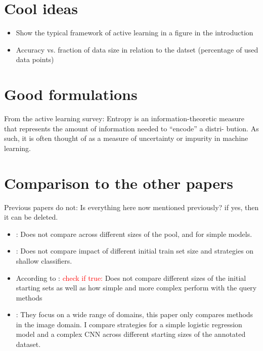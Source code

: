 \documentclass{article}
\theoremstyle{plain}
\theoremstyle{definition}
\theoremstyle{remark}
\begin{document}
\newpage

\section{Cool ideas}
\begin{itemize}
	\item Show the typical framework of active learning in a figure in the introduction
	\item Accuracy vs. fraction of data size in relation to the datset (percentage of used data points)
\end{itemize}

\section{Good formulations}
From the active learning survey: Entropy is an information-theoretic
measure that represents the amount of information needed to “encode” a distri-
bution. As such, it is often thought of as a measure of uncertainty or impurity in machine learning.

\section{Comparison to the other papers}
Previous papers do not: Is everything here now mentioned previously? if yes, then it can be deleted.
\begin{itemize}
	\item \cite{schröder_revisitinguncertaintybasedquerystrategies}: Does not compare across different sizes of the pool, and for simple models.
	\item \cite{comparativesurveydeepactive}: Does not compare impact of different initial train set size and strategies on shallow classifiers.
	
	\item According to \cite{ueno_benchmarkingofquerystrategies}: \textcolor{red}{check if true:} Does not compare different sizes of the initial starting sets as well as how simple and more complex perform with the query methods
	
	\item \cite{werner_comparableactivelearning}: They focus on a wide range of domains, this paper only compares methods in the image domain. I compare strategies for a simple logistic regression model and a complex CNN across different starting sizes of the annotated dataset. \\
\end{itemize}



\end{document}
